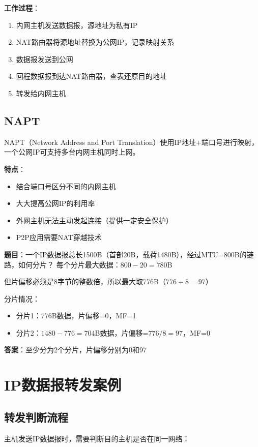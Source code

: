 \documentclass[12pt,a4paper,openany]{ctexbook}
\begin{document}
\textbf{工作过程}：
\begin{enumerate}[leftmargin=2em,itemsep=0pt]
    \item 内网主机发送数据报，源地址为私有IP
    \item NAT路由器将源地址替换为公网IP，记录映射关系
    \item 数据报发送到公网
    \item 回程数据报到达NAT路由器，查表还原目的地址
    \item 转发给内网主机
\end{enumerate}

\subsection{NAPT}
NAPT（Network Address and Port Translation）使用IP地址+端口号进行映射，一个公网IP可支持多台内网主机同时上网。

\textbf{特点}：
\begin{itemize}[leftmargin=2em,itemsep=0pt]
    \item 结合端口号区分不同的内网主机
    \item 大大提高公网IP的利用率
    \item 外网主机无法主动发起连接（提供一定安全保护）
    \item P2P应用需要NAT穿越技术
\end{itemize}

\begin{examplebox}[例题4.10 IP分片计算]
\textbf{题目}：一个IP数据报总长1500B（首部20B，载荷1480B），经过MTU=800B的链路，如何分片？
\tcblower
每个分片最大数据：$800 - 20 = 780$B

但片偏移必须是8字节的整数倍，所以最大取776B（$776 \div 8 = 97$）

分片情况：
\begin{itemize}[itemsep=0pt]
    \item 分片1：776B数据，片偏移=0，MF=1
    \item 分片2：$1480-776=704$B数据，片偏移=$776/8=97$，MF=0
\end{itemize}

\textbf{答案}：至少分为2个分片，片偏移分别为0和97
\end{examplebox}

\section{IP数据报转发案例}
\subsection{转发判断流程}
主机发送IP数据报时，需要判断目的主机是否在同一网络：
\end{document}
